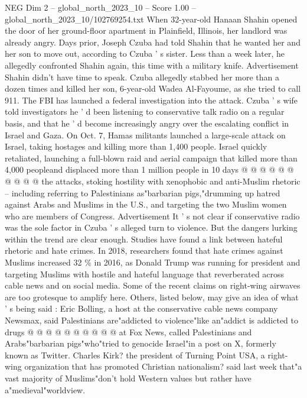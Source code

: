 \begin{textsample}{NEG Dim 2 – global\_north\_2023\_10 – Score 1.00 – global\_north\_2023\_10/102769254.txt}  \label{ex:f2_neg_166}
When 32-year-old Hanaan Shahin opened the door of her ground-floor apartment in Plainfield, Illinois, her landlord was already angry.
Days prior, Joseph Czuba had told Shahin that he wanted her and her son to move out, according to Czuba ' s sister.
Less than a week later, he allegedly confronted Shahin again, this time with a military knife.
Advertisement Shahin didn't have time to speak.
Czuba allegedly stabbed her more than a dozen times and killed her son, 6-year-old Wadea Al-Fayoume, as she tried to call 911.
The FBI has launched a federal investigation into the attack.
Czuba ' s wife told investigators he ' d been listening to conservative talk radio on a regular basis, and that he ' d become increasingly angry over the escalating conflict in Israel and Gaza.
On Oct. 7, Hamas militants launched a large-scale attack on Israel, taking hostages and killing more than 1,400 people.
Israel quickly retaliated, launching a full-blown raid and aerial campaign that killed more than 4,000 peopleand displaced more than 1 million people in 10 days @ @ @ @ @ @ @ @ @ @ the attacks, stoking hostility with xenophobic and anti-Muslim rhetoric -- including referring to Palestinians as"barbarian pigs,"drumming up hatred against Arabs and Muslims in the U.S., and targeting the two Muslim women who are members of Congress.
Advertisement It ' s not clear if conservative radio was the sole factor in Czuba ' s alleged turn to violence.
But the dangers lurking within the trend are clear enough.
Studies have found a link between hateful rhetoric and hate crimes.
In 2018, researchers found that hate crimes against Muslims increased 32 \% in 2016, as Donald Trump was running for president and targeting Muslims with hostile and hateful language that reverberated across cable news and on social media.
Some of the recent claims on right-wing airwaves are too grotesque to amplify here.
Others, listed below, may give an idea of what ' s being said : Eric Bolling, a host at the conservative cable news company Newsmax, said Palestinians are"addicted to violence"like an"addict is addicted to drugs @ @ @ @ @ @ @ @ @ @ at Fox News, called Palestinians and Arabs"barbarian pigs"who"tried to genocide Israel"in a post on X, formerly known as Twitter.
Charles Kirk? the president of Turning Point USA, a right-wing organization that has promoted Christian nationalism? said last week that"a vast majority of Muslims"don't hold Western values but rather have a"medieval"worldview.

\end{textsample}
